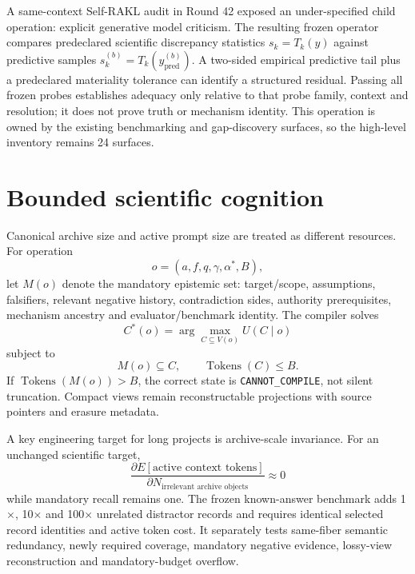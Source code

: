 \documentclass[11pt]{article}
\newcommand{\RAKL}{\textsc{RAKL}}
\newcommand{\CannotCompile}{\texttt{CANNOT\_COMPILE}}
\begin{document}
A same-context Self-\RAKL{} audit in Round 42 exposed an under-specified child operation: explicit generative model criticism. The resulting frozen operator compares predeclared scientific discrepancy statistics $s_k=T_k(y)$ against predictive samples $s_k^{(b)}=T_k(y_{\mathrm{pred}}^{(b)})$. A two-sided empirical predictive tail plus a predeclared materiality tolerance can identify a structured residual. Passing all frozen probes establishes adequacy only relative to that probe family, context and resolution; it does not prove truth or mechanism identity. This operation is owned by the existing benchmarking and gap-discovery surfaces, so the high-level inventory remains 24 surfaces.

\section{Bounded scientific cognition}
Canonical archive size and active prompt size are treated as different resources. For operation
\begin{equation}
o=(a,f,q,\gamma,\alpha^*,B),
\end{equation}
let $M(o)$ denote the mandatory epistemic set: target/scope, assumptions, falsifiers, relevant negative history, contradiction sides, authority prerequisites, mechanism ancestry and evaluator/benchmark identity. The compiler solves
\begin{equation}
C^*(o)=\arg\max_{C\subseteq V(o)}U(C\mid o)
\end{equation}
subject to
\begin{equation}
M(o)\subseteq C,\qquad \operatorname{Tokens}(C)\le B.
\end{equation}
If $\operatorname{Tokens}(M(o))>B$, the correct state is \CannotCompile{}, not silent truncation. Compact views remain reconstructable projections with source pointers and erasure metadata.

A key engineering target for long projects is archive-scale invariance. For an unchanged scientific target,
\begin{equation}
\frac{\partial E[\text{active context tokens}]}{\partial N_{\text{irrelevant archive objects}}}\approx0
\end{equation}
while mandatory recall remains one. The frozen known-answer benchmark adds 1$\times$, 10$\times$ and 100$\times$ unrelated distractor records and requires identical selected record identities and active token cost. It separately tests same-fiber semantic redundancy, newly required coverage, mandatory negative evidence, lossy-view reconstruction and mandatory-budget overflow.
\end{document}
